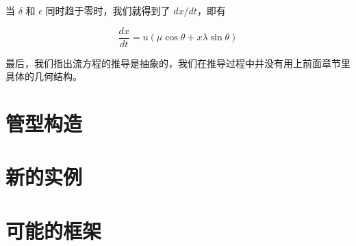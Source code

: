 \documentclass[a4paper,12pt]{article}
\numberwithin{definition}{section}
\numberwithin{lemma}{section}
\numberwithin{proposition}{section}
\numberwithin{theorem}{section}
\numberwithin{grammar}{section}
\numberwithin{program}{section}
\numberwithin{convention}{section}
\numberwithin{corollary}{section}
\begin{document}
当 $\delta$ 和 $\epsilon$ 同时趋于零时，我们就得到了 $dx / dt$，即有

\begin{equation}
    \frac{dx}{dt} = u (\mu \cos \theta + x \lambda \sin \theta)
\end{equation}

最后，我们指出流方程的推导是抽象的，我们在推导过程中并没有用上前面章节里具体的几何结构。

\newpage

\section{管型构造}

\newpage

\section{新的实例}

\newpage

\section{可能的框架}

\newpage
{}
{}


\end{document}
